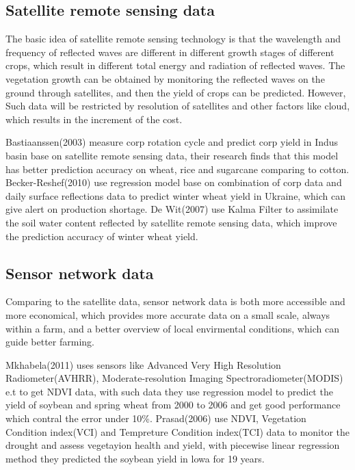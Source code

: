\documentclass[conference]{IEEEtran}
\begin{document}
\subsection{Satellite remote sensing data}
The basic idea of satellite remote sensing technology is that the wavelength and frequency of reflected waves are different in different growth stages of different crops, which result in different total energy and radiation of reflected waves. The vegetation growth can be obtained by monitoring the reflected waves on the ground through satellites, and then the yield of crops can be predicted. However, Such data will be restricted by resolution of satellites and other factors like cloud, which results in the increment of the cost.

Bastiaanssen(2003)\cite{Bastiaanssen2003} measure corp rotation cycle and predict corp yield in Indus basin base on satellite remote sensing data, their research finds that this model has better prediction accuracy on wheat, rice and sugarcane comparing to cotton. Becker-Reshef(2010)\cite{Becker-Reshef2010} use regression model base on  combination of  corp data and daily surface reflections data to predict winter wheat yield in Ukraine, which can give alert on production shortage. De Wit(2007)\cite{DeWit2007} use Kalma Filter to assimilate the soil water content reflected by satellite remote sensing data, which improve the prediction accuracy of winter wheat yield.

\subsection{Sensor network data}
Comparing to the satellite data, sensor network data is both more accessible and more economical, which provides more accurate data on a small scale, always within a farm, and a better overview of local envirmental conditions, which can guide better farming.

Mkhabela(2011)\cite{Mkhabela2011} uses sensors like Advanced Very High Resolution Radiometer(AVHRR), Moderate-resolution Imaging Spectroradiometer(MODIS) e.t to get NDVI data, with such data they use regression model to predict the yield of soybean and spring wheat from 2000 to 2006 and get good performance which contral the error under 10\%. Prasad(2006)\cite{Prasad2006} use NDVI, Vegetation Condition index(VCI) and Tempreture Condition index(TCI) data to monitor the drought and assess vegetayion health and yield, with piecewise linear regression method they predicted the soybean yield in lowa for 19 years.
\end{document}
